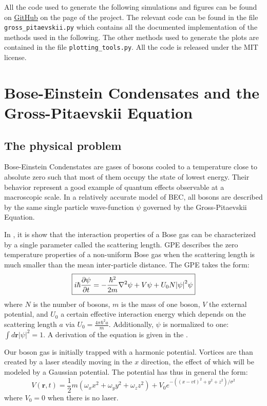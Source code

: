 \documentclass{article}
\begin{document}
All the code used to generate the following simulations and figures can be found on \href{https://github.com/superporchetta/numerical_methods_project}{\underline{GitHub}} on the page of the project. The relevant code can be found in the file \texttt{gross\_pitaevskii.py} which contains all the documented implementation of the methods used in the following. The other methods used to generate the plots are contained in the file \texttt{plotting\_tools.py}. All the code is released under the MIT license.



\section{Bose-Einstein Condensates and the Gross-Pitaevskii Equation}\label{sec:BSEandGPE}
\subsection{The physical problem}
Bose-Einstein Condenstates are gases of bosons cooled to a temperature close to absolute zero such that most of them occupy the state of lowest energy. Their behavior represent a good example of quantum effects observable at a macroscopic scale. In a relatively accurate model of BEC, all bosons are described by the same single particle wave-function $\psi$ governed by the Gross-Pitaevskii Equation. \par
In \cite{Pethick}, it is show that the interaction properties of a Bose gas can be characterized by a single parameter called the scattering length. GPE describes the zero temperature properties of a non-uniform Bose gas when the scattering length is much smaller than the mean inter-particle distance. The GPE takes the form:
\begin{equation}\label{eqGP}
    \boxed{i\hbar \pdv{\psi}{t} = -\frac{\hbar^2}{2m} \laplacian \psi + V \psi + U_0 N \abs{\psi}^2 \psi}
\end{equation}
where $N$ is the number of bosons, $m$ is the mass of one boson, $V$ the external potential, and $U_0$ a certain effective interaction energy which depends on the scattering length $a$ via $U_0=\frac{4 \pi \hbar^2a}{m}$. Additionally, $\psi$ is normalized to one: $\int d\mathbf{r}|\psi|^2=1$. A derivation of the equation is given in the .


\bigskip
Our boson gas is initially trapped with a harmonic potential. Vortices are than created by a laser steadily moving in the $x$ direction, the effect of which will be modeled by a Gaussian potential. The potential has thus in general the form:
$$
V(\mathbf{r},t)=\frac{1}{2}m(\omega_x x^2+\omega_y y^2+\omega_z z^2)+V_0 e^{-\left((x-v t)^2+y^2+z^2\right)/\sigma^2}
$$
where $V_0=0$ when there is no laser.
\end{document}

